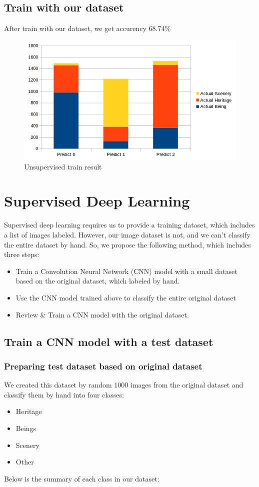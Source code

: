 \documentclass[11pt]{article}
\begin{document}
\subsection{Train with our dataset}

After train with our dataset, we get accurency 68.74\%

\begin{figure}[H]
\centering
\includegraphics[width=1\textwidth]{images/unsupervised_large_dataset_result}
\caption{Unsupervised train result}
\end{figure}

\section{Supervised Deep Learning}
Supervised deep learning requires us to provide a training dataset, which includes a list of images labeled. However, our image dataset is not, and we can't classify the entire dataset by hand. So, we propose the following method, which includes three steps:
\begin{itemize}
\item Train a Convolution Neural Network (CNN) model with a small dataset based on the original dataset, which labeled by hand.
\item Use the CNN model trained above to classify the entire original dataset
\item Review \& Train a CNN model with the original dataset.
\end{itemize}

\subsection{Train a CNN model with a test dataset}

\subsubsection{Preparing test dataset based on original dataset}
We created this dataset by random 1000 images from the original dataset and classify them by hand into four classes: 
\begin{itemize}
\item Heritage
\item Beings
\item Scenery
\item Other
\end{itemize}
Below is the summary of each class in our dataset:
\end{document}
